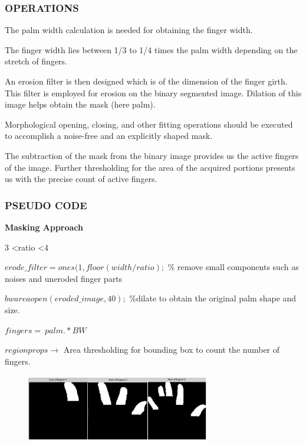 \documentclass[conference]{IEEEtran}
\begin{document}

\subsubsection{OPERATIONS}
The palm width calculation is needed for obtaining the finger width.

The finger width lies between 1/3 to 1/4 times the palm width depending on the stretch of fingers.

An erosion filter is then designed which is of the dimension of the finger girth. This filter is employed for erosion on the binary segmented image. Dilation of this image helps obtain the mask (here palm).

Morphological opening, closing, and other fitting operations should be executed to accomplish a noise-free and an explicitly shaped mask.

The subtraction of the mask \cite{7279962} from the binary image provides us the active fingers of the image. Further thresholding for the area of the acquired portions presents us with the precise count of active fingers.


\subsubsection{PSEUDO CODE}

\textbf{Masking Approach}
\begin{flushleft}
3 \textless ratio \textless 4

$erode\_filter=ones(1,floor(width/ratio); $ \% remove small components such as noises and uneroded finger parts
 
$bwareaopen(eroded\_image,40);$ \%dilate to obtain the original palm shape and size. 

$fingers=~palm.*BW$ 

$regionprops \rightarrow$ Area thresholding for bounding box to count the number of fingers.

\begin{figure}[h!]
	\centering
	\includegraphics[width = 8cm, height = 3cm]{method1_1}
\end{figure}
\end{flushleft}
\end{document}
